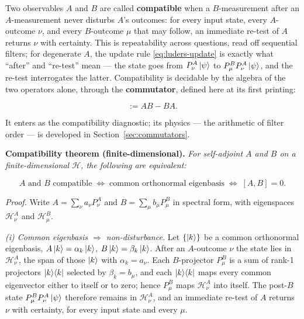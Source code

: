 Two observables $A$ and $B$ are called \textbf{compatible} when a $B$-measurement after an $A$-measurement never disturbs $A$'s outcomes: for every input state, every $A$-outcome $\nu$, and every $B$-outcome $\mu$ that may follow, an immediate re-test of $A$ returns $\nu$ with certainty. This is repeatability across questions, read off sequential filters; for degenerate $A$, the update rule \eqref{eq:luders-update} is exactly what ``after'' and ``re-test'' mean --- the state goes from $P_\nu^A\ket{\psi}$ to $P_\mu^B P_\nu^A\ket{\psi}$, and the re-test interrogates the latter. Compatibility is decidable by the algebra of the two operators alone, through the \textbf{commutator}, defined here at its first printing:
\begin{linenomath}
\begin{equation}
    [A,B]:=AB-BA .
    \label{eq:commutator-def}
\end{equation}
\end{linenomath}
It enters as the compatibility diagnostic; its physics --- the arithmetic of filter order --- is developed in Section~\ref{sec:commutators}.

\medskip\noindent\textbf{Compatibility theorem (finite-dimensional).} \emph{For self-adjoint $A$ and $B$ on a finite-dimensional $\mathcal H$, the following are equivalent:}
\begin{linenomath}
\begin{equation}
    \text{$A$ and $B$ compatible}
    \;\Longleftrightarrow\;
    \text{common orthonormal eigenbasis}
    \;\Longleftrightarrow\;
    [A,B]=0 .
    \label{eq:common-eigenbasis}
\end{equation}
\end{linenomath}

\medskip\noindent\emph{Proof.} Write $A=\sum_\nu a_\nu P_\nu^A$ and $B=\sum_\mu b_\mu P_\mu^B$ in spectral form, with eigenspaces $\mathcal H_\nu^A$ and $\mathcal H_\mu^B$.

\emph{(i) Common eigenbasis $\Rightarrow$ non-disturbance.} Let $\{\ket{k}\}$ be a common orthonormal eigenbasis, $A\ket{k}=\alpha_k\ket{k}$, $B\ket{k}=\beta_k\ket{k}$. After an $A$-outcome $\nu$ the state lies in $\mathcal H_\nu^A$, the span of those $\ket{k}$ with $\alpha_k=a_\nu$. Each $B$-projector $P_\mu^B$ is a sum of rank-1 projectors $\ket{k}\!\bra{k}$ selected by $\beta_k=b_\mu$, and each $\ket{k}\!\bra{k}$ maps every common eigenvector either to itself or to zero; hence $P_\mu^B$ maps $\mathcal H_\nu^A$ into itself. The post-$B$ state $P_\mu^BP_\nu^A\ket{\psi}$ therefore remains in $\mathcal H_\nu^A$, and an immediate re-test of $A$ returns $\nu$ with certainty, for every input state and every $\mu$.

